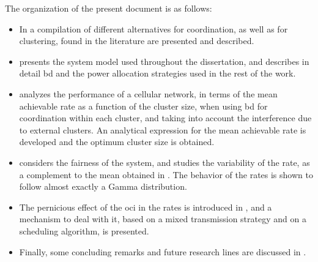 The organization of the present document is as follows:

\begin{itemize}
    \item In  a compilation of different alternatives for
        coordination, as well as for clustering, found in the literature are
        presented and described.
    \item {} presents the system model used throughout the
        dissertation, and describes in detail \gls{bd} and the power allocation
        strategies used in the rest of the work.
    \item {} analyzes the performance of a cellular network,
        in terms of the mean achievable rate as a function of the cluster size,
        when using \gls{bd} for coordination within each cluster, and taking
        into account the interference due to external clusters. An analytical
        expression for the mean achievable rate is developed and the optimum
        cluster size is obtained.
    \item {} considers the fairness of the system, and
        studies the variability of the rate, as a complement to the mean
        obtained in . The behavior of the rates is shown
        to follow almost exactly a Gamma distribution.
    \item The pernicious effect of the \gls{oci} in the rates is introduced in
        , and a mechanism to deal with it, based on
        a mixed transmission strategy and on a scheduling algorithm, is
        presented.
    \item Finally, some concluding remarks and future research lines are
        discussed in .
\end{itemize}
